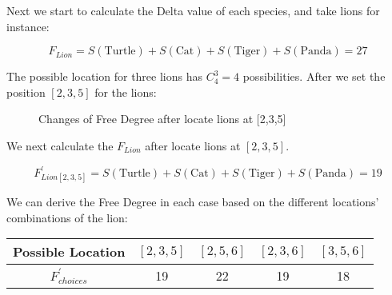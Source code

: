 \documentclass{mcmthesis}
\begin{document}
				Next we start to calculate the Delta value of each species, and take lions for instance:
				
				\begin{equation}
					F _ { Lion } = S ( \text {Turtle} ) + S ( \mathrm { Cat } ) + S ( \text {Tiger} ) + S ( \text {Panda} ) = 27
				\end{equation}
				
				The possible location for three lions has $C_4^3=4$ possibilities. After we set the position $[2, 3, 5]$ for the lions:
				
				\begin{figure}[htbp]
					\centering
					\centering
					\caption{Changes of Free Degree after locate lions at [2,3,5] }
				\end{figure}
			
				We next calculate the $F _ { Lion }$  after locate lions at $[2,3,5]$.
				
				\begin{equation}
				F _ { Lion[2,3,5] }^{'} = S ( \text {Turtle} ) + S ( \mathrm { Cat } ) + S ( \text {Tiger} ) + S ( \text {Panda} ) = 19
				\end{equation}
				
				We can derive the Free Degree in each case based on the different locations' combinations of the lion:
				
				\begin{table}[h]
					\centering
					\setlength{\tabcolsep}{4mm}
					\begin{tabular}{ccccc}
						\toprule[1.5pt]  %
						Possible Location & $[2,3,5]$ & $[2,5,6]$ & $[2,3,6]$ & $[3,5,6]$ \\
						\midrule  %
						$F_{choices}^{'}$ & 19 & 22 & 19 & 18 \\
						\bottomrule[1.5pt] %
					\end{tabular}
				\end{table}
			
\end{document}
